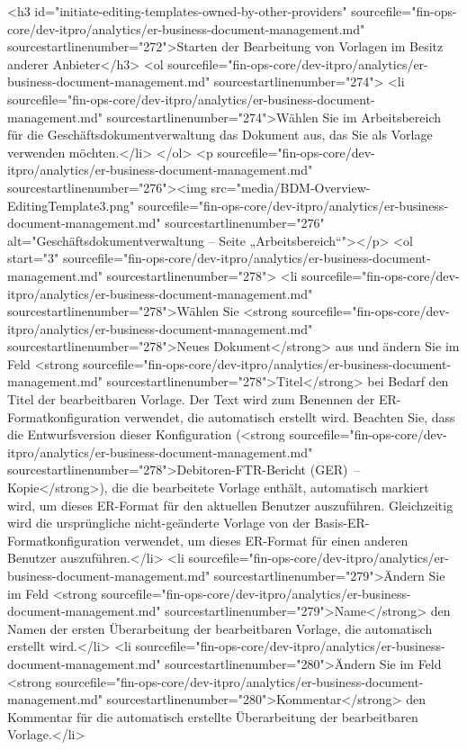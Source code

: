 <h3 id="initiate-editing-templates-owned-by-other-providers" sourcefile="fin-ops-core/dev-itpro/analytics/er-business-document-management.md" sourcestartlinenumber="272">Starten der Bearbeitung von Vorlagen im Besitz anderer Anbieter</h3>
<ol sourcefile="fin-ops-core/dev-itpro/analytics/er-business-document-management.md" sourcestartlinenumber="274">
<li sourcefile="fin-ops-core/dev-itpro/analytics/er-business-document-management.md" sourcestartlinenumber="274">Wählen Sie im Arbeitsbereich für die Geschäftsdokumentverwaltung das Dokument aus, das Sie als Vorlage verwenden möchten.</li>
</ol>
<p sourcefile="fin-ops-core/dev-itpro/analytics/er-business-document-management.md" sourcestartlinenumber="276"><img src="media/BDM-Overview-EditingTemplate3.png" sourcefile="fin-ops-core/dev-itpro/analytics/er-business-document-management.md" sourcestartlinenumber="276" alt="Geschäftsdokumentverwaltung – Seite „Arbeitsbereich“"></p>
<ol start="3" sourcefile="fin-ops-core/dev-itpro/analytics/er-business-document-management.md" sourcestartlinenumber="278">
<li sourcefile="fin-ops-core/dev-itpro/analytics/er-business-document-management.md" sourcestartlinenumber="278">Wählen Sie <strong sourcefile="fin-ops-core/dev-itpro/analytics/er-business-document-management.md" sourcestartlinenumber="278">Neues Dokument</strong> aus und ändern Sie im Feld <strong sourcefile="fin-ops-core/dev-itpro/analytics/er-business-document-management.md" sourcestartlinenumber="278">Titel</strong> bei Bedarf den Titel der bearbeitbaren Vorlage. Der Text wird zum Benennen der ER-Formatkonfiguration verwendet, die automatisch erstellt wird. Beachten Sie, dass die Entwurfsversion dieser Konfiguration (<strong sourcefile="fin-ops-core/dev-itpro/analytics/er-business-document-management.md" sourcestartlinenumber="278">Debitoren-FTR-Bericht (GER) – Kopie</strong>), die die bearbeitete Vorlage enthält, automatisch markiert wird, um dieses ER-Format für den aktuellen Benutzer auszuführen. Gleichzeitig wird die ursprüngliche nicht-geänderte Vorlage von der Basis-ER-Formatkonfiguration verwendet, um dieses ER-Format für einen anderen Benutzer auszuführen.</li>
<li sourcefile="fin-ops-core/dev-itpro/analytics/er-business-document-management.md" sourcestartlinenumber="279">Ändern Sie im Feld <strong sourcefile="fin-ops-core/dev-itpro/analytics/er-business-document-management.md" sourcestartlinenumber="279">Name</strong> den Namen der ersten Überarbeitung der bearbeitbaren Vorlage, die automatisch erstellt wird.</li>
<li sourcefile="fin-ops-core/dev-itpro/analytics/er-business-document-management.md" sourcestartlinenumber="280">Ändern Sie im Feld <strong sourcefile="fin-ops-core/dev-itpro/analytics/er-business-document-management.md" sourcestartlinenumber="280">Kommentar</strong> den Kommentar für die automatisch erstellte Überarbeitung der bearbeitbaren Vorlage.</li>
